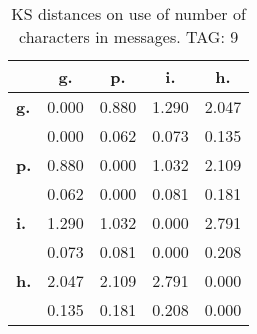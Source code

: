 \begin{table}[h!]
\begin{center}
\begin{tabular}{| l || c | c | c | c |}\hline
 & {\bf g.} & {\bf p.} & {\bf i.} & {\bf h.} \\\hline\hline
{\bf g.} & 0.000 & 0.880 & 1.290 & 2.047 \\
{\bf } & 0.000 & 0.062 & 0.073 & 0.135 \\\hline
{\bf p.} & 0.880 & 0.000 & 1.032 & 2.109 \\
{\bf } & 0.062 & 0.000 & 0.081 & 0.181 \\\hline
{\bf i.} & 1.290 & 1.032 & 0.000 & 2.791 \\
{\bf } & 0.073 & 0.081 & 0.000 & 0.208 \\\hline
{\bf h.} & 2.047 & 2.109 & 2.791 & 0.000 \\
{\bf } & 0.135 & 0.181 & 0.208 & 0.000 \\\hline
\end{tabular}
\caption{KS distances on use of number of characters in messages. TAG: 9}
\end{center}
\end{table}